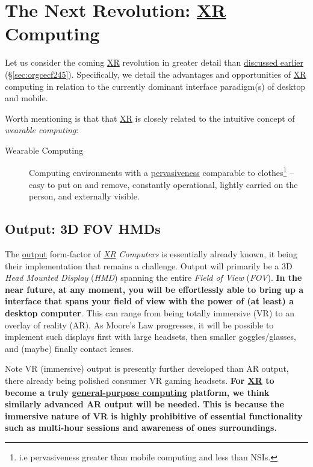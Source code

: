 \documentclass[logo,bsc,singlespacing,parskip]{infthesis}
\begin{document}
\chapter{The Next Revolution: \hyperref[org53dbe83]{XR} Computing}
\label{sec:org35335a0}
Let us consider the coming \hyperref[org53dbe83]{XR} revolution in greater detail than \hyperref[sec:orgcecf245]{discussed earlier} (\S \ref{sec:orgcecf245}).
Specifically, we detail the advantages and opportunities of \hyperref[org53dbe83]{XR} computing in relation to the currently dominant interface paradigm(s) of desktop and mobile.

Worth mentioning is that that \hyperref[org53dbe83]{XR} is closely related to the intuitive concept of \emph{wearable computing}:

\begin{mdframed}
\begin{description}
\item[{Wearable Computing\label{wearable computing}}] Computing environments with a \hyperref[pervasiveness]{pervasiveness} comparable to clothes\footnote{i.e pervasiveness greater than mobile computing and less than NSIs.} -- easy to put on and remove, constantly operational, lightly carried on the person, and externally visible.
\end{description}
\end{mdframed}
\section{Output: 3D FOV HMDs}
\label{sec:org31dbfb0}
The \hyperref[output]{output} form-factor of \emph{\hyperref[org53dbe83]{XR} Computers} is essentially already known, it being their implementation that remains a challenge.
Output will primarily be a 3D \emph{Head Mounted Display} (\emph{HMD}) spanning the entire \emph{Field of View} (\emph{FOV}).
\textbf{In the near future, at any moment, you will be effortlessly able to bring up a interface that spans your field of view with the power of (at least) a desktop computer}.
This can range from being totally immersive (VR) to an overlay of reality (AR).
As Moore's Law progresses, it will be possible to implement such displays first with large headsets, then smaller goggles/glasses, and (maybe) finally contact lenses.

Note VR (immersive) output is presently further developed than AR output, there already being polished consumer VR gaming headsets.
\textbf{For \hyperref[org53dbe83]{XR} to become a truly \hyperref[org2840555]{general-purpose computing} platform, we think similarly advanced AR output will be needed.}
\textbf{This is because the immersive nature of VR is highly prohibitive of essential functionality such as multi-hour sessions and awareness of ones surroundings.}
\end{document}
